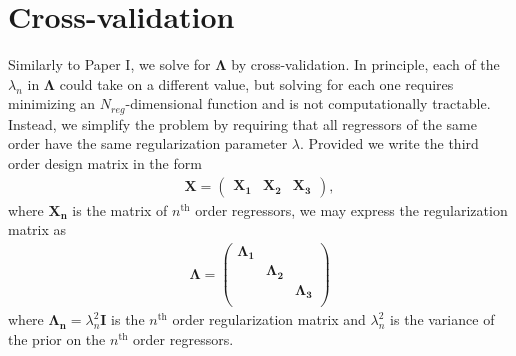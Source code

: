 \documentclass[]{emulateapj}
\begin{document}
\section{Cross-validation}
Similarly to Paper I, we solve for $\mathbf{\Lambda}$ by cross-validation. 
In principle, each of the $\lambda_n$ in $\mathbf{\Lambda}$ could take on a different value, but solving for each one
requires minimizing an $N_{reg}$-dimensional function and is not computationally tractable.
Instead, we simplify the problem by requiring that all regressors of the same order have the
same regularization parameter $\lambda$. Provided we write the third order design matrix in the form
%
\begin{align}
\label{eq:design}
\mathbf{X} = 
\left(
\begin{array}{ccc}
  \mathbf{X_1} & \mathbf{X_2} & \mathbf{X_3}
\end{array}
\right),
\end{align}
%
where $\mathbf{X_n}$ is the matrix of $n^\mathrm{th}$ order regressors, we may
express the regularization matrix as
%
\begin{align}
\label{eq:Lambda}
\mathbf{\Lambda} = 
\left(
\begin{array}{ccc}
  \mathbf{\Lambda_1}      &                       & \\
  &                       \mathbf{\Lambda_2}      & \\
  &                       &                       \mathbf{\Lambda_3} \\
\end{array}
\right)
\end{align}
%
where $\mathbf{\Lambda_n} = \lambda_{n}^2\mathbf{I}$ is the 
$n^\mathrm{th}$ order regularization matrix and $\lambda_{n}^2$ is the variance
of the prior on the $n^\mathrm{th}$ order regressors. 
\end{document}

